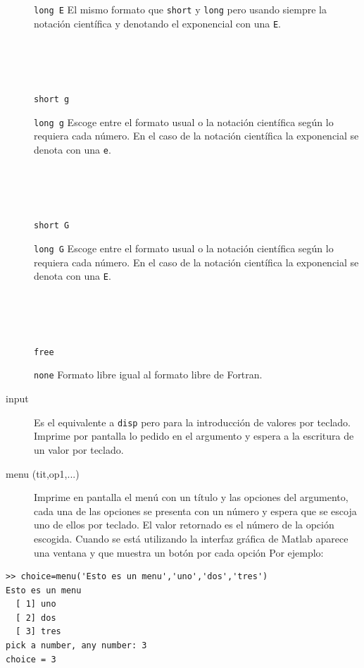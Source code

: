 \begin{description}
\begin{minipage}[c]{0.8\columnwidth}
{\texttt{long E}} El mismo formato que \texttt{short} y \texttt{long}
pero usando siempre la notación científica y denotando el exponencial
con una \texttt{E}.\end{minipage}%
\\
\\
\\
\begin{minipage}[c]{0.8\columnwidth}%
{\texttt{short g}} 

{\texttt{long g}} Escoge entre el formato usual o la notación científica
según lo requiera cada número. En el caso de la notación científica
la exponencial se denota con una \texttt{e}.\end{minipage}%
\\
\\
\\
\begin{minipage}[c]{0.8\columnwidth}%
{\texttt{short G}} 

{\texttt{long G}} Escoge entre el formato usual o la notación
científica según lo requiera cada número. En el caso de la notación
científica la exponencial se denota con una \texttt{E}.\end{minipage}%
\\
\\
\\
\begin{minipage}[c]{0.8\columnwidth}%
\texttt{free} 

\texttt{none} Formato libre igual al formato libre de
Fortran.\end{minipage}%

\item [input\index{input}]Es el equivalente a \texttt{disp} pero para
  la introducción de valores por teclado. Imprime por pantalla lo
  pedido en el argumento y espera a la escritura de un valor por
  teclado.
\item [{menu (tit,op1,...)}]Imprime en pantalla el menú
  con un título y las opciones del argumento, cada una de las opciones
  se presenta con un número y espera que se escoja uno de ellos por
  teclado.  El valor retornado es el número de la opción escogida.
  Cuando se está utilizando la interfaz gráfica de Matlab aparece una
  ventana y que muestra un botón por cada opción Por ejemplo:
\end{description}
  \begin{lstlisting}
>> choice=menu('Esto es un menu','uno','dos','tres')
Esto es un menu
  [ 1] uno
  [ 2] dos
  [ 3] tres
pick a number, any number: 3
choice = 3
\end{lstlisting}

